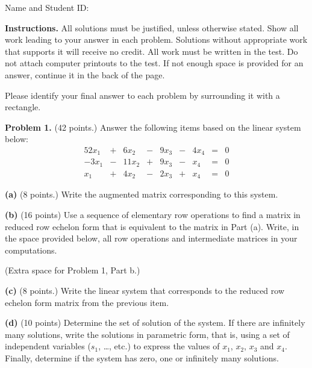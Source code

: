 \documentclass[12pt]{article}
\begin{document}
Name and Student ID: \hrulefill


\textbf{Instructions.} All solutions must be justified, unless otherwise stated. Show all work leading to your answer in each problem. Solutions without appropriate work that supports it will receive no credit. All work must be written in the test. Do not attach computer printouts to the test. If not enough space is provided for an answer, continue it in the back of the page.

Please identify your final answer to each problem by surrounding it with a rectangle.


\clearpage

\textbf{Problem 1.} (42 points.) Answer the following items based on the linear system below:
\begin{alignat*}{5}
 2x_1 & {}+{} &  6x_2  & {}-{} & 9x_3  & {}-{} & 4x_4 & {}={} &  0 \\
-3x_1 & {}-{} &  11x_2 & {}+{} & 9x_3  & {}-{} &  x_4 & {}={} &  0 \\
  x_1 & {}+{} &   4x_2 & {}-{} & 2x_3  & {}+{} &  x_4 & {}={} &  0
\end{alignat*}

\textbf{(a)} (8 points.) Write the augmented matrix corresponding to this system.

\clearpage

\textbf{(b)} (16 points) Use a sequence of elementary row operations to find a matrix in reduced row echelon form that is equivalent to the matrix in Part (a). Write, in the space provided below, all row operations and intermediate matrices in your computations.

\clearpage

(Extra space for Problem 1, Part b.)

\clearpage

\textbf{(c)} (8 points.) Write the linear system that corresponds to the reduced row echelon form matrix from the previous item.

\vskip4in

\textbf{(d)} (10 points) Determine the set of solution of the system. If there are infinitely many solutions, write the solutions in parametric form, that is, using a set of independent variables ($s_1$, \dots, etc.) to express the values of $x_1$, $x_2$, $x_3$ and $x_4$. Finally, determine if the system has zero, one or infinitely many solutions.

\clearpage
\end{document}
